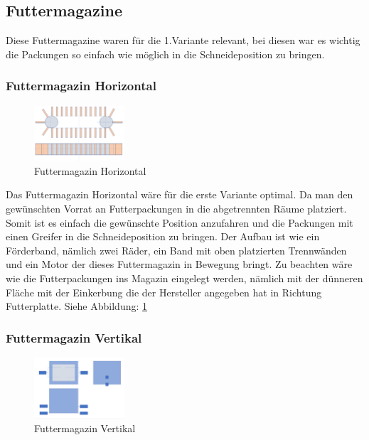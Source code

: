 \subsection{Futtermagazine}

Diese Futtermagazine waren für die 1.Variante relevant, bei diesen war es wichtig die Packungen so einfach wie möglich in die Schneideposition zu bringen. 

\subsubsection{Futtermagazin Horizontal}

\begin{figure}
\vspace{-40pt}
  \begin{center}
    \includegraphics[width=0.30\textwidth]{Bilder/Powerpoint/Futtermagazin_horizontal}
  \end{center}
  \caption{Futtermagazin Horizontal}
  \label{Magazin Horizontal}
  \vspace{-10pt}
\end{figure} 

Das Futtermagazin Horizontal wäre für die erste Variante optimal. Da man den gewünschten Vorrat an Futterpackungen in die abgetrennten Räume platziert. Somit ist es einfach die gewünschte Position anzufahren und die Packungen mit einen Greifer in die Schneideposition zu bringen. Der Aufbau ist wie ein Förderband, nämlich zwei Räder, ein Band mit oben platzierten Trennwänden und ein Motor der dieses Futtermagazin in Bewegung bringt. Zu beachten wäre wie die Futterpackungen ins Magazin eingelegt werden, nämlich mit der dünneren Fläche mit der Einkerbung die der Hersteller angegeben hat in Richtung Futterplatte. Siehe Abbildung: \ref{Magazin Horizontal}

\subsubsection{Futtermagazin Vertikal}

\begin{figure}
\vspace{-40pt}
  \begin{center}
    \includegraphics[width=0.3\textwidth]{Bilder/Powerpoint/Futtermagazin_vertikal}
  \end{center}
  \caption{Futtermagazin Vertikal}
  \label{Magazin Vertikal}
  \vspace{-10pt}
\end{figure}

